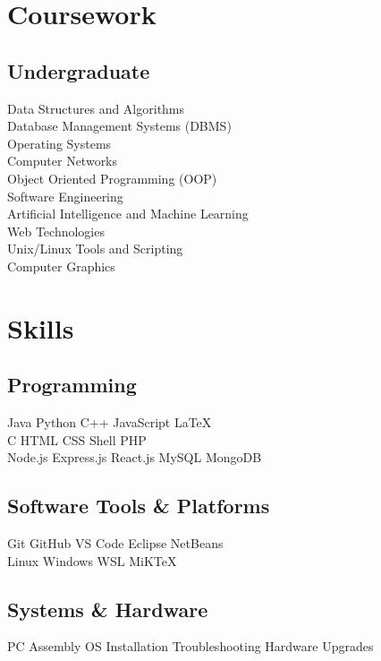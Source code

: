 \documentclass[]{deedy-resume-openfont}
\begin{document}
\begin{minipage}[t]{0.33\textwidth}
\section{Coursework}

\subsection{Undergraduate}
Data Structures and Algorithms \\
Database Management Systems (DBMS) \\
Operating Systems \\
Computer Networks \\
Object Oriented Programming (OOP) \\
Software Engineering \\
Artificial Intelligence and Machine Learning \\
Web Technologies \\
Unix/Linux Tools and Scripting \\
Computer Graphics \\

\section{Skills}
\subsection{Programming}
Java \textbullet{} Python \textbullet{} C++ \textbullet{} JavaScript \textbullet{} \LaTeX \\
C \textbullet{} HTML \textbullet{} CSS \textbullet{} Shell \textbullet{} PHP \\
Node.js \textbullet{} Express.js \textbullet{} React.js \textbullet{} MySQL \textbullet{} MongoDB \\
\sectionsep

\subsection{Software Tools \& Platforms}
Git \textbullet{} GitHub \textbullet{} VS Code \textbullet{} Eclipse \textbullet{} NetBeans \\
Linux \textbullet{} Windows \textbullet{} WSL \textbullet{} MiKTeX \\
\sectionsep

\subsection{Systems \& Hardware}
PC Assembly \textbullet{} OS Installation \textbullet{} Troubleshooting \textbullet{} Hardware Upgrades \\


%
%

\end{minipage} 
\end{document}
